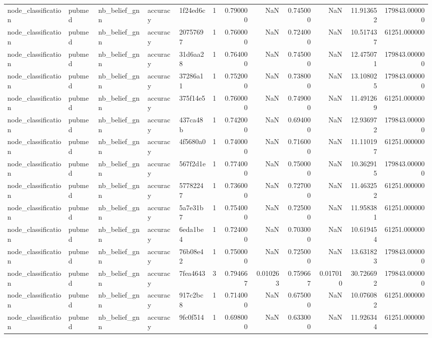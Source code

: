 \begin{tabular}{lllllrrrrrrr}
node_classification & pubmed & nb_belief_gnn & accuracy & 1f24ed6c & 1 & 0.790000 & NaN & 0.745000 & NaN & 11.913652 & 179843.000000 \\
node_classification & pubmed & nb_belief_gnn & accuracy & 20757697 & 1 & 0.760000 & NaN & 0.724000 & NaN & 10.517437 & 61251.000000 \\
node_classification & pubmed & nb_belief_gnn & accuracy & 31d6aa28 & 1 & 0.764000 & NaN & 0.745000 & NaN & 12.475071 & 179843.000000 \\
node_classification & pubmed & nb_belief_gnn & accuracy & 37286a11 & 1 & 0.752000 & NaN & 0.738000 & NaN & 13.108025 & 179843.000000 \\
node_classification & pubmed & nb_belief_gnn & accuracy & 375f14e5 & 1 & 0.760000 & NaN & 0.749000 & NaN & 11.491269 & 61251.000000 \\
node_classification & pubmed & nb_belief_gnn & accuracy & 437ca48b & 1 & 0.742000 & NaN & 0.694000 & NaN & 12.936972 & 179843.000000 \\
node_classification & pubmed & nb_belief_gnn & accuracy & 4f5680a0 & 1 & 0.740000 & NaN & 0.716000 & NaN & 11.110197 & 61251.000000 \\
node_classification & pubmed & nb_belief_gnn & accuracy & 567f2d1e & 1 & 0.774000 & NaN & 0.750000 & NaN & 10.362915 & 179843.000000 \\
node_classification & pubmed & nb_belief_gnn & accuracy & 57782247 & 1 & 0.736000 & NaN & 0.727000 & NaN & 11.463252 & 61251.000000 \\
node_classification & pubmed & nb_belief_gnn & accuracy & 5a7e31b7 & 1 & 0.754000 & NaN & 0.725000 & NaN & 11.958381 & 61251.000000 \\
node_classification & pubmed & nb_belief_gnn & accuracy & 6eda1be4 & 1 & 0.724000 & NaN & 0.703000 & NaN & 10.619454 & 61251.000000 \\
node_classification & pubmed & nb_belief_gnn & accuracy & 76b08e42 & 1 & 0.750000 & NaN & 0.725000 & NaN & 13.631823 & 179843.000000 \\
node_classification & pubmed & nb_belief_gnn & accuracy & 7fea4643 & 3 & 0.794667 & 0.010263 & 0.759667 & 0.017010 & 30.726692 & 179843.000000 \\
node_classification & pubmed & nb_belief_gnn & accuracy & 917c2bc8 & 1 & 0.714000 & NaN & 0.675000 & NaN & 10.076082 & 61251.000000 \\
node_classification & pubmed & nb_belief_gnn & accuracy & 9fc0f514 & 1 & 0.698000 & NaN & 0.633000 & NaN & 11.926344 & 61251.000000 \\

\end{tabular}
